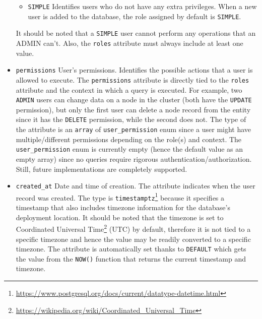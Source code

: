 \begin{itemize}
\begin{itemize}
      \item \texttt{SIMPLE}
        \newline
        Identifies users who do not have any extra privileges.
        \newline
        When a new user is added to the database, the role assigned by default
        is \texttt{SIMPLE}.
    \end{itemize}
    It should be noted that a \texttt{SIMPLE} user cannot perform any operations
    that an ADMIN can't. Also, the \texttt{roles} attribute must always include at
    least one value.

  \item \texttt{permissions}
    \newline
    User's permissions.
    \newline
    Identifies the possible actions that a user is allowed to execute.
    \newline
    The \texttt{permissions} attribute is directly tied to the \texttt{roles}
    attribute and the context in which a query is executed. For example, two
    \texttt{ADMIN} users can change data on a node in the cluster (both have the
    \texttt{UPDATE} permission), but only the first user can delete a node record
    from the entity since it has the \texttt{DELETE} permission, while the second
    does not.
    \newline
    The type of the attribute is an \texttt{array} of \texttt{user\_permission}
    enum since a user might have multiple/different permissions depending on the
    role(s) and context.
    \newline
    The \texttt{user\_permission} enum is currently empty (hence the default
    value as an empty array) since no queries require rigorous authentication/authorization.
    Still, future implementations are completely supported.

  \item \texttt{created\_at}
    \newline
    Date and time of creation.
    \newline
    The attribute indicates when the user record was created.
    \newline
    The type is \texttt{timestamptz}\footnote{\url{https://www.postgresql.org/docs/current/datatype-datetime.html}}
    because it specifies a timestamp that also includes timezone information for
    the database's deployment location. It should be noted that the timezone is
    set to Coordinated Universal Time\footnote{\url{https://wikipedia.org/wiki/Coordinated_Universal_Time}}
    (UTC) by default, therefore it is not tied to a specific timezone and hence the
    value may be readily converted to a specific timezone.
    \newline
    The attribute is automatically set thanks to \texttt{DEFAULT} which gets the
    value from the \texttt{NOW()} function that returns the current timestamp
    and timezone.


\end{itemize}
